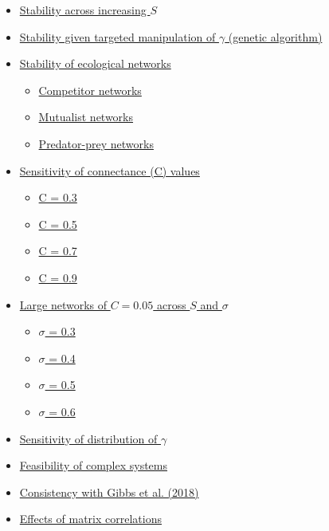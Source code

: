 \documentclass[]{article}
\providecommand{\tightlist}{%
  \setlength{\itemsep}{0pt}\setlength{\parskip}{0pt}}
\begin{document}
\begin{itemize}
\tightlist
\item
  \protect\hyperlink{IncrS}{Stability across increasing \(S\)}
\item
  \protect\hyperlink{ga}{Stability given targeted manipulation of
  \(\gamma\) (genetic algorithm)}
\item
  \protect\hyperlink{ecological}{Stability of ecological networks}

  \begin{itemize}
  \tightlist
  \item
    \protect\hyperlink{competition}{Competitor networks}
  \item
    \protect\hyperlink{mutualism}{Mutualist networks}
  \item
    \protect\hyperlink{pred-prey}{Predator-prey networks}
  \end{itemize}
\item
  \protect\hyperlink{connectance}{Sensitivity of connectance (C) values}

  \begin{itemize}
  \tightlist
  \item
    \protect\hyperlink{connect3}{C = 0.3}
  \item
    \protect\hyperlink{connect5}{C = 0.5}
  \item
    \protect\hyperlink{connect7}{C = 0.7}
  \item
    \protect\hyperlink{connect9}{C = 0.9}
  \end{itemize}
\item
  \protect\hyperlink{sigma}{Large networks of \(C = 0.05\) across \(S\)
  and \(\sigma\)}

  \begin{itemize}
  \tightlist
  \item
    \protect\hyperlink{sigma3}{\(\sigma\) = 0.3}
  \item
    \protect\hyperlink{sigma4}{\(\sigma\) = 0.4}
  \item
    \protect\hyperlink{sigma5}{\(\sigma\) = 0.5}
  \item
    \protect\hyperlink{sigma6}{\(\sigma\) = 0.6}
  \end{itemize}
\item
  \protect\hyperlink{gam_dist}{Sensitivity of distribution of
  \(\gamma\)}
\item
  \protect\hyperlink{Feasibility}{Feasibility of complex systems}
\item
  \protect\hyperlink{Gibbs}{Consistency with Gibbs et al. (2018)}
\item
  \protect\hyperlink{rhos}{Effects of matrix correlations}
\end{itemize}
\end{document}
